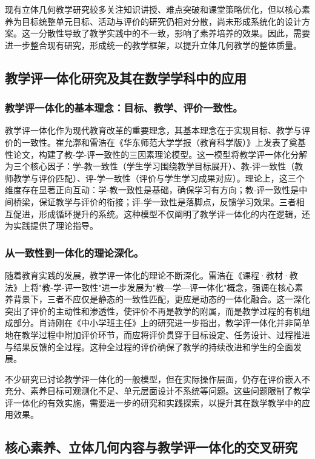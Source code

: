 \documentclass[UTF8,a4paper,12pt,twoside]{ctexart}
\begin{document}
现有立体几何教学研究较多关注知识讲授、难点突破和课堂策略优化，但以核心素养为目标统整单元目标、活动与评价的研究仍相对分散，尚未形成系统化的设计方案。这一分散性导致了教学实践中的不一致，影响了素养培养的效果。因此，需要进一步整合现有研究，形成统一的教学框架，以提升立体几何教学的整体质量。

\subsection{教学评一体化研究及其在数学学科中的应用}

\subsubsection{教学评一体化的基本理念：目标、教学、评价一致性。}
教学评一体化作为现代教育改革的重要理念，其基本理念在于实现目标、教学与评价的一致性。崔允漷和雷浩\cite{cui_lei2015}在《华东师范大学学报（教育科学版）》上发表了奠基性论文，构建了教-学-评一致性的三因素理论模型。这一模型将教学评一体化分解为三个核心因子：学-教一致性（学生学习围绕教学目标展开）、教-评一致性（教师教学与评价匹配）、评-学一致性（评价与学生学习成果对应）。理论上，这三个维度存在显著正向互动：学-教一致性是基础，确保学习有方向；教-评一致性是中间桥梁，保证教学与评价的衔接；评-学一致性是落脚点，反馈学习效果。三者相互促进，形成循环提升的系统。这种模型不仅阐明了教学评一体化的内在逻辑，还为实践提供了理论指导。

\subsubsection{从一致性到一体化的理论深化。}
随着教育实践的发展，教学评一体化的理论不断深化。雷浩\cite{lei2023}在《课程·教材·教法》上将"教-学-评一致性"进一步发展为"教—学—评一体化"概念，强调在核心素养背景下，三者不应仅是静态的一致性匹配，更应是动态的一体化融合。这一深化突出了评价的主动性和渗透性，使评价不再是教学的附属，而是教学过程的有机组成部分。肖诗刚\cite{xiao2025}在《中小学班主任》上的研究进一步指出，教学评一体化并非简单地在教学过程中附加评价环节，而应将评价贯穿于目标设定、任务设计、过程推进与结果反馈的全过程。这种全过程的评价确保了教学的持续改进和学生的全面发展。

不少研究已讨论教学评一体化的一般模型，但在实际操作层面，仍存在评价嵌入不充分、素养目标可观测化不足、单元层面设计不系统等问题。这些问题限制了教学评一体化的有效实施，需要进一步的研究和实践探索，以提升其在数学教学中的应用效果。

\subsection{核心素养、立体几何内容与教学评一体化的交叉研究}
\end{document}
